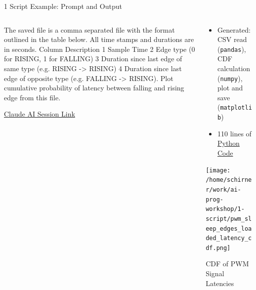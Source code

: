 \documentclass[xcolor=dvipsnames, aspectratio=169]{beamer}
\begin{document}
\begin{frame}[fragile]{1 Script Example: Prompt and Output}
  \begin{columns}
    \begin{column}{0.6\textwidth}
    \begin{promptbox}
      The saved file is a comma separated file with the format outlined in the table below. All time stamps and durations are in seconds. Column Description 1 Sample Time 2 Edge type (0 for RISING, 1 for FALLING) 3 Duration since last edge of same type (e.g. RISING -> RISING) 4 Duration since last edge of opposite type (e.g. FALLING -> RISING). Plot cumulative probability of latency between falling and rising edge from this file.      
    \end{promptbox}
      \small\href{https://claude.ai/share/7e11fde4-bb5e-476e-b8f3-9dad820724f5}{Claude AI Session Link}
    \end{column}
    
    \begin{column}{0.4\textwidth}
      \begin{itemize}
        \item Generated: CSV read (\texttt{pandas}), CDF calculation (\texttt{numpy}), plot and save (\texttt{matplotlib})
        \item 110 lines of \href{https://github.com/neu-ece-esl/ai-prog-workshop/blob/main/1-script/analyze_latency.py}{Python Code}
      \end{itemize}
      \texttt{[image: /home/schirner/work/ai-prog-workshop/1-script/pwm\_sleep\_edges\_loaded\_latency\_cdf.png]}
      \small\centerline{CDF of PWM Signal Latencies}
      
    \end{column}
  \end{columns}
\end{frame}
\end{document}
